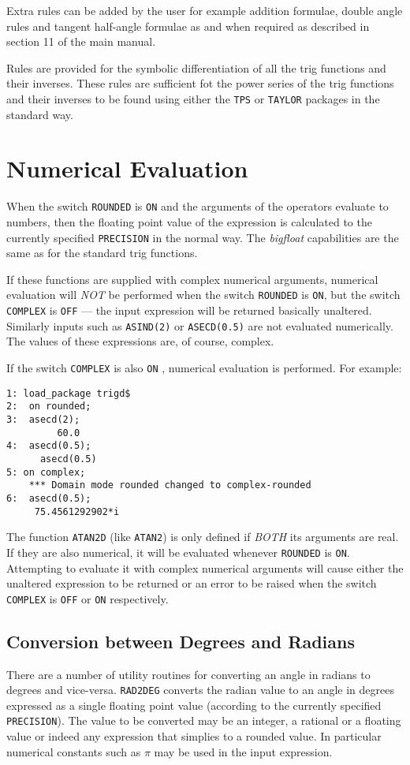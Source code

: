 Extra rules can be added by the user for example addition formulae, double  angle rules and tangent half-angle formulae as and when required as described in section 11 of the main {\REDUCE} manual. 

Rules are provided for the symbolic differentiation of all the trig  functions and their inverses.  These rules are sufficient fot the power series of the trig functions and their inverses to be found using either the \texttt{TPS} or \texttt{TAYLOR} packages in the standard way.


\section{Numerical Evaluation}
When the switch \texttt{ROUNDED} is \texttt{ON} and the arguments of the operators evaluate to numbers, then the floating point value of the expression is calculated to the currently specified \texttt{PRECISION} in the normal way.  The {\it bigfloat} capabilities are  the same as for the standard trig functions.   

If these functions are supplied with complex  numerical arguments, numerical evaluation will \emph{NOT} be performed when the switch \texttt{ROUNDED} is \texttt{ON}, but the switch \texttt{COMPLEX} is  \texttt{OFF} --- the input expression will be returned basically unaltered. Similarly inputs such as 
\texttt{ASIND(2)} or \texttt{ASECD(0.5)} are not evaluated numerically.  The values of these expressions are, of course, complex.

If the switch \texttt{COMPLEX} is also \texttt{ON} , numerical evaluation is performed.  For example:
\begin{verbatim}
1: load_package trigd$
2:  on rounded;
3:  asecd(2);
         60.0  
4:  asecd(0.5);
      asecd(0.5)
5: on complex;
    *** Domain mode rounded changed to complex-rounded
6:  asecd(0.5);
     75.4561292902*i
\end{verbatim}

The function \texttt{ATAN2D} (like \texttt{ATAN2}) is only defined if \emph{BOTH} its arguments are real. If they are also numerical, it will be evaluated whenever  \texttt{ROUNDED} is \texttt{ON}. Attempting to evaluate it with complex numerical arguments will cause either the unaltered expression to be returned or an error to be 
raised when the switch \texttt{COMPLEX} is \texttt{OFF} or \texttt{ON} respectively.

\subsection{Conversion between Degrees and Radians}
There are a number of utility routines for converting an angle in radians to degrees and vice-versa.  \texttt{RAD2DEG} converts the radian value to  an angle in degrees expressed as a single floating point value (according to the currently specified \texttt{PRECISION}).  
The value to be converted may be an integer, a rational or a floating value or indeed any expression that simplies to a rounded value. In particular  numerical constants such as $\pi$ may be used in the input expression.

